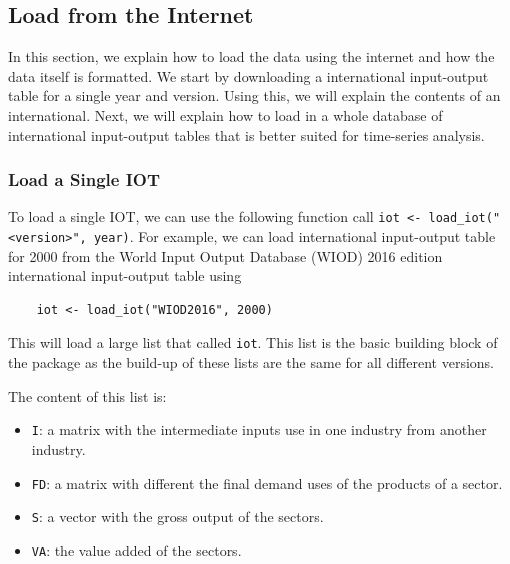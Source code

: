 \documentclass[10pt,a4paper]{paper}
\begin{document}
	\subsection{Load from the Internet}
	
	In this section, we explain how to load the data using the internet and how the data itself is formatted. We start by downloading a international input-output table for a single year and version. Using this, we will explain the contents of an international. Next, we will explain how to load in a whole database of international input-output tables that is better suited for time-series analysis.
	
	\subsubsection{Load a Single IOT}
	\label{subsec:loadsingleiot}
	To load a single IOT, we can use the following function call \texttt{iot <- load\_iot("<version>", year)}.  For example, we can load international input-output table for 2000 from the World Input Output Database (WIOD) 2016 edition international input-output table using
	\begin{Verbatim}
	iot <- load_iot("WIOD2016", 2000)
	\end{Verbatim}
	
	This will load a large list that called \texttt{iot}. This list is the basic building block of the package as the build-up of these lists are the same for all different versions.
	
	The content of this list is:
	\begin{itemize}
		\item \texttt{I}: a matrix with the intermediate inputs use in one industry from another industry.
		\item \texttt{FD}: a matrix with different the final demand uses of the products of a sector. 
		\item \texttt{S}: a vector with the gross output of the sectors.
		\item \texttt{VA}: the value added of the sectors.
	\end{itemize}	
	
\end{document}
